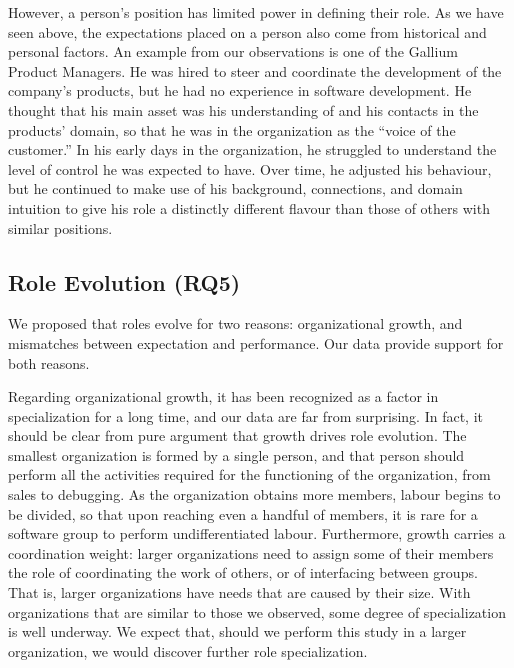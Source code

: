 \documentclass[10pt, conference, compsocconf]{IEEEtran}
\begin{document}
However, a person's position has limited power in defining their role. As we have seen above, the expectations placed on a person also come from historical and personal factors. An example from our observations is one of the Gallium Product Managers. He was hired to steer and coordinate the development of the company's products, but he had no experience in software development. He thought that his main asset was his understanding of and his contacts in the products' domain, so that he was in the organization as the ``voice of the customer.'' In his early days in the organization, he struggled to understand the level of control he was expected to have. Over time, he adjusted his behaviour, but he continued to make use of his background, connections, and domain intuition to give his role a distinctly different flavour than those of others with similar positions.


\subsection{Role Evolution (RQ5)}

We proposed that roles evolve for two reasons: organizational growth, and mismatches between expectation and performance. Our data provide support for both reasons.

Regarding organizational growth, it has been recognized as a factor in specialization for a long time, and our data are far from surprising. In fact, it should be clear from pure argument that growth drives role evolution. The smallest organization is formed by a single person, and that person should perform all the activities required for the functioning of the organization, from sales to debugging. As the organization obtains more members, labour begins to be divided, so that upon reaching even a handful of members, it is rare for a software group to perform undifferentiated labour. Furthermore, growth carries a coordination weight: larger organizations need to assign some of their members the role of coordinating the work of others, or of interfacing between groups. That is, larger organizations have needs that are caused by their size. With organizations that are similar to those we observed, some degree of specialization is well underway. We expect that, should we perform this study in a larger organization, we would discover further role specialization.
\end{document}
